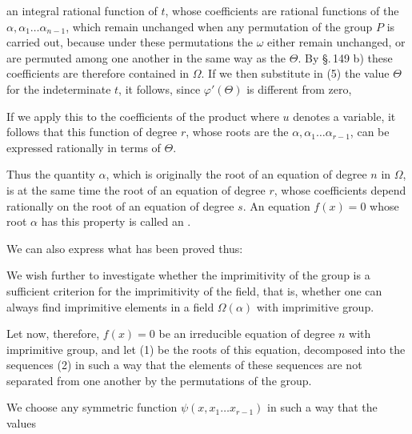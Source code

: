
an integral rational function of $t$, whose coefficients are rational
functions of the $\alpha, \alpha_1 \ldots \alpha_{n-1}$, which remain unchanged
when any permutation of the group $P$ is carried out,
because under these permutations the $\omega$ either remain unchanged,
or are permuted among one another in the same way as the $\Theta$. By \S.\,149 b) these coefficients are therefore contained
in $\Omega$. If we then substitute in (5) the value $\Theta$ for the
indeterminate $t$, it follows, since $\varphi'(\Theta)$ is different from zero,

If we apply this to the coefficients of the product
where $u$ denotes a variable, it follows that this function
of degree $r$, whose roots are the $\alpha, \alpha_1 \ldots \alpha_{r-1}$, can be
expressed rationally in terms of $\Theta$.

Thus the quantity $\alpha$, which is originally the root of an
equation of degree $n$ in $\Omega$, is at the same time the root of an equation
of degree $r$, whose coefficients depend rationally on the root of an
equation of degree $s$. An equation $f(x) = 0$
whose root $\alpha$ has this property is called an .

We can also express what has been proved thus:


We wish further to investigate whether the imprimitivity of the
group is a sufficient criterion for the imprimitivity of the
field, that is, whether one can always find imprimitive elements in a field $\Omega(\alpha)$
with imprimitive group.

Let now, therefore, $f(x) = 0$ be an irreducible equation of degree $n$
with imprimitive group, and let (1) be the roots
of this equation, decomposed into the sequences (2) in such a way that the
elements of these sequences are not separated from one another
by the permutations of the group.

We choose any symmetric function $\psi(x, x_1 \ldots x_{r-1})$
in such a way that the values
